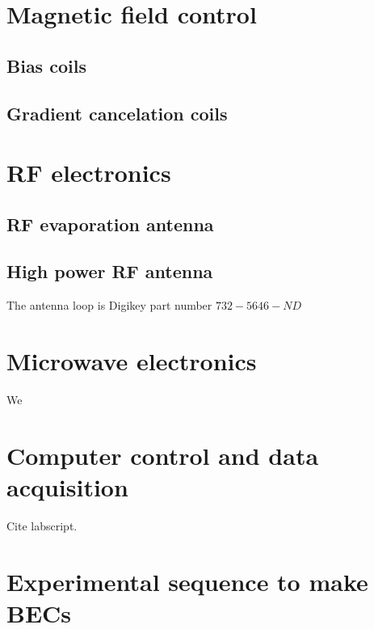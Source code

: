 \section{Magnetic field control}
\subsection{Bias coils}
\subsection{Gradient cancelation coils}

\section{RF electronics}
\subsection{RF evaporation antenna}
\subsection{High power RF antenna}
The antenna loop is Digikey part number $732-5646-ND$

\section{Microwave electronics}

We


\section{Computer control and data acquisition}
Cite labscript. 
\section{Experimental sequence to make BECs}
\label{sec:making-becs}











